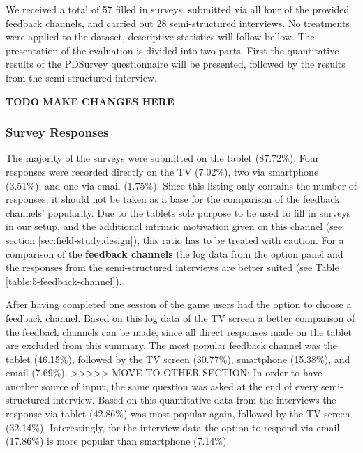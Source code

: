 	We received a total of 57 filled in surveys, submitted via all four of the provided feedback channels, and carried out 28 semi-structured interviews. 
	No treatments were applied to the dataset, descriptive statistics will follow bellow. The presentation of the evaluation is divided into two parts. First the quantitative results of the PDSurvey questionnaire will be presented, followed by the results from the semi-structured interview. 

	\textbf{TODO MAKE CHANGES HERE}



	\subsubsection{Survey Responses}
	\label{5:results:survey}

	The majority of the surveys were submitted on the tablet (87.72\%). Four responses were recorded directly on the TV (7.02\%), two via smartphone (3.51\%), and one via email (1.75\%). Since this listing only contains the number of responses, it should not be taken as a base for the comparison of the feedback channels' popularity. %
	Due to the tablets sole purpose to be used to fill in surveys in our setup, and the additional intrinsic motivation given on this channel (see section \ref{sec:field-study:design}), this ratio has to be treated with caution. For a comparison of the \textbf{feedback channels} the log data from the option panel and the responses from the semi-structured interviews are better suited (see Table \ref{table:5-feedback-channel}).

	\label{5:results:feedback-channel}

	After having completed one session of the game users had the option to choose a feedback channel. Based on this log data of the TV screen a better comparison of the feedback channels can be made, since all direct responses made on the tablet are excluded from this summary. The most popular feedback channel was the tablet (46.15\%), followed by the TV screen (30.77\%), smartphone (15.38\%), and email (7.69\%).
	>>>>> MOVE TO OTHER SECTION: In order to have another source of input, the same question was asked at the end of every semi-structured interview. Based on this quantitative data from the interviews the response via tablet (42.86\%) was most popular again, followed by the TV screen (32.14\%). Interestingly, for the interview data the option to respond via email (17.86\%) is more popular than smartphone (7.14\%). 
		
